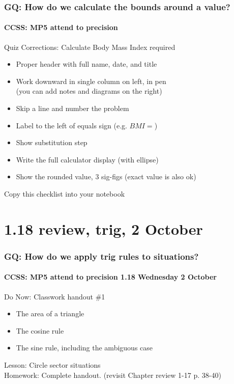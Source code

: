 \documentclass{beamer}
\begin{document}
  \frame
  {
    \frametitle{GQ: How do we calculate the bounds around a value?}
    \framesubtitle{CCSS: MP5 attend to precision}

    \begin{block}{Quiz Corrections: Calculate Body Mass Index 
      \alert{required}}
      \begin{itemize} 
          \item Proper header with full name, date, and title
          \item Work downward in single column on left, in pen 
            \\(you can add notes and diagrams on the right)
          \item Skip a line and number the problem
          \item Label to the left of equals sign (e.g. $BMI=$)
          \item Show substitution step
          \item Write the full calculator display (with ellipse)
          \item Show the rounded value, 3 sig-figs (exact value is also ok)
       \end{itemize}
      \end{block}
    Copy this checklist into your notebook
    
  }

  \section{1.18 review, trig, 2 October}
  \frame
  {
    \frametitle{GQ: How do we apply trig rules to situations?}
    \framesubtitle{CCSS: MP5 attend to precision \hfill \alert{1.18 Wednesday 2 October}}

    \begin{block}{Do Now: Classwork handout \#1}
      \begin{itemize}
          \item The area of a triangle
          \item The cosine rule 
          \item The sine rule, including the ambiguous case
       \end{itemize}
      \end{block}
    Lesson: Circle sector situations\\ \smallskip
    Homework: Complete handout. (revisit Chapter review 1-17 p. 38-40)
  }
\end{document}
